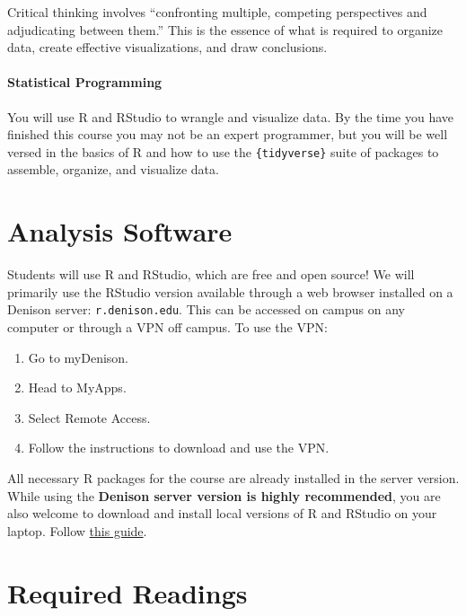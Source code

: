 \documentclass[11pt,]{article}
\providecommand{\tightlist}{%
  \setlength{\itemsep}{0pt}\setlength{\parskip}{0pt}}
\begin{document}
Critical thinking involves ``confronting multiple, competing
perspectives and adjudicating between them.'' This is the essence of
what is required to organize data, create effective visualizations, and
draw conclusions.

\hypertarget{statistical-programming}{%
\paragraph{Statistical Programming}\label{statistical-programming}}

You will use R and RStudio to wrangle and visualize data. By the time
you have finished this course you may not be an expert programmer, but
you will be well versed in the basics of R and how to use the
\texttt{\{tidyverse\}} suite of packages to assemble, organize, and
visualize data.

\hypertarget{analysis-software}{%
\section{Analysis Software}\label{analysis-software}}

Students will use R and RStudio, which are free and open source! We will
primarily use the RStudio version available through a web browser
installed on a Denison server: \texttt{r.denison.edu}. This can be
accessed on campus on any computer or through a VPN off campus. To use
the VPN:

\begin{enumerate}
\def\labelenumi{\arabic{enumi}.}
\tightlist
\item
  Go to myDenison.
\item
  Head to MyApps.
\item
  Select Remote Access.
\item
  Follow the instructions to download and use the VPN.
\end{enumerate}

All necessary R packages for the course are already installed in the
server version. While using the \textbf{Denison server version is highly
recommended}, you are also welcome to download and install local
versions of R and RStudio on your laptop. Follow
\href{https://www.rstudio.com/products/rstudio/download/}{this guide}.

\hypertarget{required-readings}{%
\section{Required Readings}\label{required-readings}}
\end{document}
